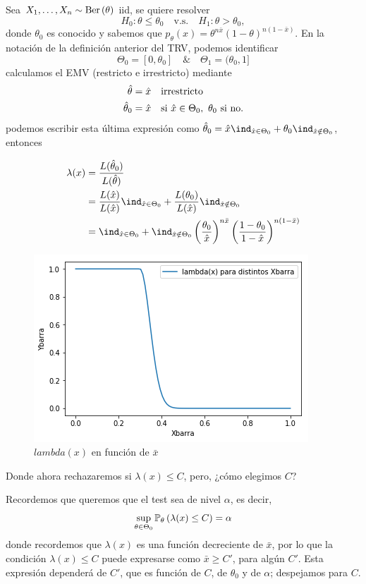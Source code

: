 \begin{example}
	Sea $X_1,\ldots,X_n\sim\text{Ber}\left(\theta\right)$ iid, se quiere resolver
	\begin{equation}
		H_0:\theta \leq\theta_0\quad \text{v.s.}\quad H_1:\theta >\theta_0,
	\end{equation}
donde $\theta_0$ es conocido y sabemos que $p_\theta(x) = \theta^{n\bar{x}}(1-\theta)^{n(1-\bar{x})}$. En la notación de la definición anterior del TRV, podemos identificar
\begin{equation}
	\Theta_0 = [0,\theta_0] \quad \& \quad \Theta_1 = (\theta_0, 1]
\end{equation}
calculamos el EMV (restricto e irrestricto) mediante 
\begin{align}
	\thetahat &= \hat{x}\quad \text{irrestricto}\\
	\thetahat_0 &= \hat{x} \quad \text{si } \hat{x}\in\Theta_0,\ \theta_0 \text{ si no.}
\end{align}
podemos escribir esta última expresión como $\thetahat_0 = \hat{x} \ind_{\hat{x}\in\Theta_0} + \theta_0\ind_{\hat{x}\notin\Theta_0}$, entonces

\begin{align}
	\lambda(x) &= \frac{L(\thetahat_0)}{L(\thetahat)}\\ 
				&= \frac{L(\hat{x})}{L(\hat{x})} \ind_{\hat{x}\in\Theta_0} + \frac{L(\theta_0)}{L(\hat{x})} \ind_{\hat{x}\notin\Theta_0} \\
				&= \ind_{\hat{x}\in\Theta_0} + \ind_{\hat{x}\notin\Theta_0} \left(\frac{\theta_0}{\hat{x}}\right)^{n\bar{x}}\left(\frac{1-\theta_0}{1-\hat{x}}\right)^{n(1-\bar{x})}
\end{align}
\begin{figure}[ht]
    \centering
    \includegraphics[scale=0.7]{img/LKratio.png}
    \caption{$lambda(x)$ en función de $\bar{x}$}
    \label{fig:lk_ratio}
\end{figure}
Donde ahora rechazaremos si $\lambda(x)\leq C$, pero, ¿cómo elegimos $C$?

Recordemos que queremos que el test sea de nivel $\alpha$, es decir, 
\begin{equation}
 	\sup_{\theta\in\Theta_0} \mathbb{P}_\theta \left(\lambda(x)\leq C\right) = \alpha
 \end{equation} 
 donde recordemos que $\lambda(x)$ es una función decreciente de $\bar{x}$, por lo que la condición $\lambda(x)\leq C$ puede expresarse como $\bar{x}\geq C'$, para algún $C'$. Esta expresión dependerá de $C'$, que es función de $C$, de $\theta_0$ y de $\alpha$; despejamos para $C$.

 \end{example} 
